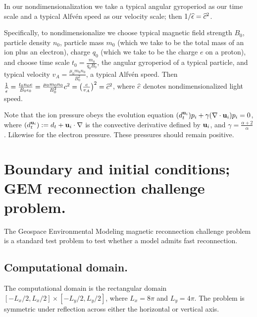 \documentclass[12pt,fleqn]{article}
\numberwithin{equation}{section}
\begin{document}
In our nondimensionalization we take a typical
angular gyroperiod as our time scale and
a typical Alfv\'en speed as our velocity scale;
then $1/\widehat\epsilon=\widehat c^2$.

Specifically, to nondimensionalize
we choose typical magnetic field strength $B_0$,
particle density $n_0$, particle mass $m_0$
(which we take to be the total mass of an ion plus an electron),
charge $q_0$ (which we take to be the charge $e$ on a proton),
and choose time scale
$t_0=\frac{m_0}{q_0 B_0}$, the angular gyroperiod
of a typical particle, and typical velocity
$v_A = \frac{\mu_0 m_0 n_0}{B_0^2}$, a typical Alfv\'en speed.
Then
$\frac{1}{\widehat\epsilon} = \frac{t_0 n_0 e}{B_0 \epsilon_0}
   = \frac{\mu_0 m_0 n_0}{B_0^2} c^2
   = \big(\frac{c}{v_A}\big)^2=\widehat c^2$,
where $\widehat c$ denotes nondimensionalized light speed.

Note that the ion pressure obeys the evolution equation
$(d^{\mathbf{u}_i}_t)p_i+\gamma(\nabla\cdot\mathbf{u}_i)p_i=0$,
where $(d^{\mathbf{u}_i}_t):=d_t+\mathbf{u}_i\cdot\nabla$
is the convective derivative defined by $\mathbf{u}_i$,
and $\gamma=\frac{\alpha+2}{\alpha}$.  Likewise for the
electron pressure.  These pressures should remain positive.

\section{Boundary and initial conditions; GEM reconnection challenge problem.}

The Geospace Environmental Modeling magnetic reconnection
challenge problem is a standard test problem to test whether
a model admits fast reconnection.

\subsection{Computational domain.}
The computational domain is the rectangular domain
$[-L_x/2,L_x/2]\times[-L_y/2,L_y/2]$,
where $L_x=8\pi$ and $L_y=4\pi$.
The problem is symmetric under reflection across
either the horizontal or vertical axis.
\end{document}
